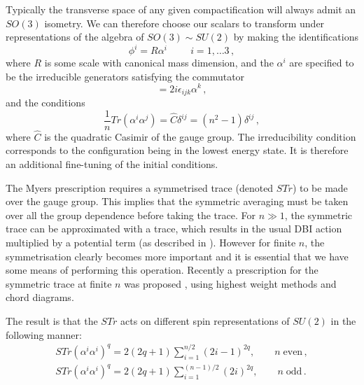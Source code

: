 Typically the transverse space of any given compactification will always admit
an $SO(3)$ isometry. We can therefore choose our scalars to 
transform under representations of the algebra of $SO(3) \sim SU(2)$ by making 
the identifications
\begin{equation}
\phi^i = R \alpha^i \hspace{1cm} i =1,  \ldots 3 \,,
\end{equation}
where $R$ is some scale with canonical mass dimension, and the $\alpha^i$ are
specified to be the irreducible generators satisfying the commutator
\begin{equation}
[\alpha^i, \alpha^j] = 2i \epsilon_{ijk} \alpha^k \,,
\end{equation}
and the conditions
\begin{equation}
\frac{1}{n} Tr(\alpha^i \alpha^j) = \hat{C} \delta^{ij} = (n^2-1) \delta^{ij}
\,,
\end{equation}
where $\hat{C}$ is the quadratic Casimir of the gauge group.
The irreducibility condition corresponds to the configuration being in the
lowest energy state. It is therefore an additional fine-tuning
of the initial conditions. 

The Myers prescription requires a symmetrised trace (denoted $STr$) to 
be made over the gauge group. This implies that 
the symmetric averaging must be taken over all the group dependence 
before taking the trace. For $n \gg 1$, the symmetric trace can be approximated with a trace, 
which results in the usual DBI action multiplied by a potential term (as
described in \cite{thomasward, Kachru:2002gs}). 
However for finite $n$, the symmetrisation clearly becomes more important and it is essential that
we
have some means of performing this operation. Recently
a prescription for the symmetric trace at finite $n$ was proposed \cite{Ramgoolam:2004gw,
McNamara:2005ry}, 
using highest weight methods and chord diagrams. 

The result is that the $STr$ acts on different spin representations of $SU(2)$ 
in the following manner:
\begin{eqnarray}
STr (\alpha^i \alpha^i)^q = 2(2q+1)\sum_{i=1}^{n/2}(2i-1)^{2q} , 
\qquad n\; \mathrm{ even}\,, 
\\
STr (\alpha^i \alpha^i)^q = 2(2q+1)\sum_{i=1}^{(n-1)/2} (2i)^{2q} , 
\qquad n\; \mathrm{ odd}\,.
\end{eqnarray}

